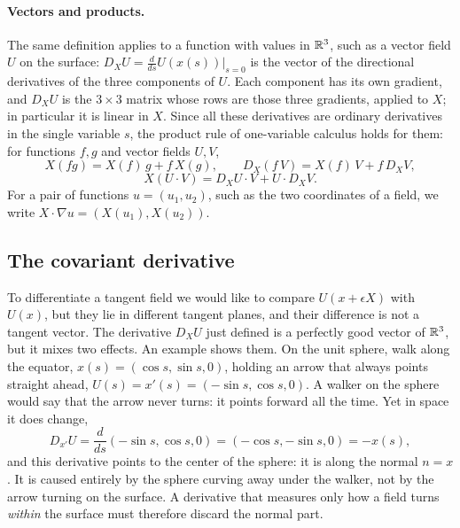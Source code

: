 \paragraph{Vectors and products.} The same definition applies to a function with values in $\mathbb{R}^3$, such as a vector field $U$ on the surface: $D_X U = \frac{d}{ds} U(x(s))\big|_{s = 0}$ is the vector of the directional derivatives of the three components of $U$. Each component has its own gradient, and $D_X U$ is the $3\times 3$ matrix whose rows are those three gradients, applied to $X$; in particular it is linear in $X$. Since all these derivatives are ordinary derivatives in the single variable $s$, the product rule of one-variable calculus holds for them: for functions $f, g$ and vector fields $U, V$,
\begin{equation*}
X(fg) = X(f)\, g + f\, X(g), \qquad D_X (f\, V) = X(f)\, V + f\, D_X V,
\end{equation*}
\begin{equation*}
X(U\cdot V) = D_X U\cdot V + U\cdot D_X V .
\end{equation*}
For a pair of functions $u = (u_1, u_2)$, such as the two coordinates of a field, we write $X\cdot\nabla u = (X(u_1), X(u_2))$.

\subsection{The covariant derivative}

To differentiate a tangent field we would like to compare $U(x + \epsilon X)$ with $U(x)$, but they lie in different tangent planes, and their difference is not a tangent vector. The derivative $D_X U$ just defined is a perfectly good vector of $\mathbb{R}^3$, but it mixes two effects. An example shows them. On the unit sphere, walk along the equator, $x(s) = (\cos s, \sin s, 0)$, holding an arrow that always points straight ahead, $U(s) = x'(s) = (-\sin s, \cos s, 0)$. A walker on the sphere would say that the arrow never turns: it points forward all the time. Yet in space it does change,
\begin{equation*}
D_{x'} U = \frac{d}{ds} (-\sin s, \cos s, 0) = (-\cos s, -\sin s, 0) = -x(s),
\end{equation*}
and this derivative points to the center of the sphere: it is along the normal $n = x$. It is caused entirely by the sphere curving away under the walker, not by the arrow turning on the surface. A derivative that measures only how a field turns \emph{within} the surface must therefore discard the normal part.

